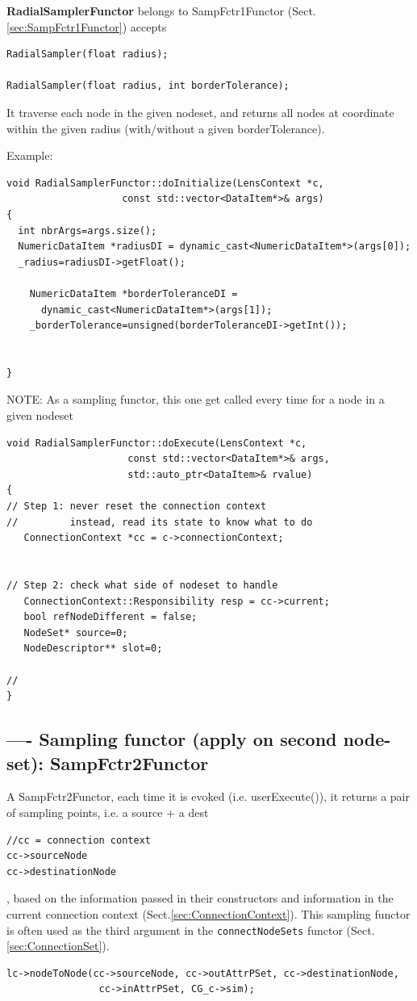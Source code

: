 {\bf RadialSamplerFunctor} belongs to SampFctr1Functor (Sect.\ref{sec:SampFctr1Functor})
accepts
\begin{verbatim}
RadialSampler(float radius);

RadialSampler(float radius, int borderTolerance);
\end{verbatim}

It traverse each node in the given nodeset, and returns all nodes at coordinate
within the given radius (with/without a given borderTolerance).

Example: 
\begin{lstlisting}
void RadialSamplerFunctor::doInitialize(LensContext *c, 
					const std::vector<DataItem*>& args)
{
  int nbrArgs=args.size();
  NumericDataItem *radiusDI = dynamic_cast<NumericDataItem*>(args[0]);
  _radius=radiusDI->getFloat();

    NumericDataItem *borderToleranceDI = 
      dynamic_cast<NumericDataItem*>(args[1]);
    _borderTolerance=unsigned(borderToleranceDI->getInt());


}
\end{lstlisting}


NOTE: As a sampling functor, this one get called every time for a node in a
given nodeset
\begin{lstlisting}
void RadialSamplerFunctor::doExecute(LensContext *c, 
				     const std::vector<DataItem*>& args, 
				     std::auto_ptr<DataItem>& rvalue)
{
// Step 1: never reset the connection context
//         instead, read its state to know what to do
   ConnectionContext *cc = c->connectionContext;
   
   
// Step 2: check what side of nodeset to handle
   ConnectionContext::Responsibility resp = cc->current;
   bool refNodeDifferent = false;
   NodeSet* source=0;
   NodeDescriptor** slot=0;

// 
}
\end{lstlisting}



\subsection{---- Sampling functor (apply on second node-set): SampFctr2Functor}
\label{sec:SampFctr2Functor}

A SampFctr2Functor, each time it is evoked (i.e. userExecute()), it returns a
pair of sampling points, i.e. a source + a dest
\begin{verbatim}
//cc = connection context
cc->sourceNode 
cc->destinationNode 
\end{verbatim}
, based on the information passed in their constructors and information in the
current connection context (Sect.\ref{sec:ConnectionContext}).
This sampling functor is often used as the third argument in the
\verb!connectNodeSets! functor (Sect.\ref{sec:ConnectionSet}).
\begin{verbatim}
lc->nodeToNode(cc->sourceNode, cc->outAttrPSet, cc->destinationNode,
                cc->inAttrPSet, CG_c->sim);
\end{verbatim}


